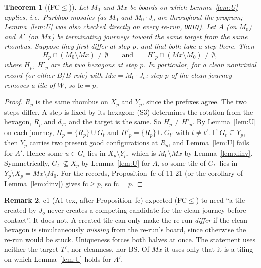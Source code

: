 \documentclass[11pt]{article}
\newtheorem{theorem}{Theorem}\newtheorem{lemma}[theorem]{Lemma}\newtheorem{proposition}[theorem]{Proposition}
\theoremstyle{definition}\newtheorem{definition}[theorem]{Definition}\newtheorem{remark}[theorem]{Remark}
\begin{document}
\begin{theorem}[(FC$\le$)]\label{thm:fc}
Let $M_0$ and $Mx$ be boards on which Lemma~\ref{lem:U} applies, i.e.\ Purbhoo mosaics (as $M_0$ and $M_0\cdot J_o$ are throughout the program; Lemma~\ref{lem:U} was also checked directly on every re-run, \texttt{UNIQ}). Let $A$ (on $M_0$) and $A'$ (on $Mx$) be terminating journeys toward the same target from the same rhombus. Suppose they first differ at step $p$, and that both take a step there. Then
\[H_p\cap(M_0\setminus Mx)\ne\emptyset\qquad\text{and}\qquad H'_p\cap(Mx\setminus M_0)\ne\emptyset,\]
where $H_p$, $H'_p$ are the two hexagons at step $p$. In particular, for a clean nontrivial record (or either $B/B$ role) with $Mx=M_0\cdot J_o$: step $p$ of the clean journey removes a tile of $W$, so $\mathrm{fc}=p$.
\end{theorem}
\begin{proof}
$R_p$ is the same rhombus on $X_p$ and $Y_p$, since the prefixes agree. The two steps differ. A step is fixed by its hexagon: (S3) determines the rotation from the hexagon, $R_p$ and $d_T$, and the target is the same. So $H_p\ne H'_p$. By Lemma~\ref{lem:U} on each journey, $H_p=\{R_p\}\cup G_t$ and $H'_p=\{R_p\}\cup G_{t'}$ with $t\ne t'$.
If $G_t\subseteq Y_p$, then $Y_p$ carries two present good configurations at $R_p$, and Lemma~\ref{lem:U} fails for $A'$. Hence some $u\in G_t$ lies in $X_p\setminus Y_p$, which is $M_0\setminus Mx$ by Lemma~\ref{lem:dinv}.
Symmetrically, $G_{t'}\not\subseteq X_p$ by Lemma~\ref{lem:U} for $A$, so some tile of $G_{t'}$ lies in $Y_p\setminus X_p=Mx\setminus M_0$.
For the records, Proposition~fc of 11-21 (or the corollary of Lemma~\ref{lem:dinv}) gives $\mathrm{fc}\ge p$, so $\mathrm{fc}=p$.
\end{proof}
\begin{remark}
c1 (A1 tex, after Proposition~fc) expected (FC$\le$) to need ``a tile created by $J_o$ never creates a competing candidate for the clean journey before contact''. It does not. A created tile can only make the re-run \emph{differ} if the clean hexagon is simultaneously \emph{missing} from the re-run's board, since otherwise the re-run would be stuck. Uniqueness forces both halves at once. The statement uses neither the target $T'$, nor cleanness, nor BS. Of $Mx$ it uses only that it is a tiling on which Lemma~\ref{lem:U} holds for $A'$.
\end{remark}
\end{document}
